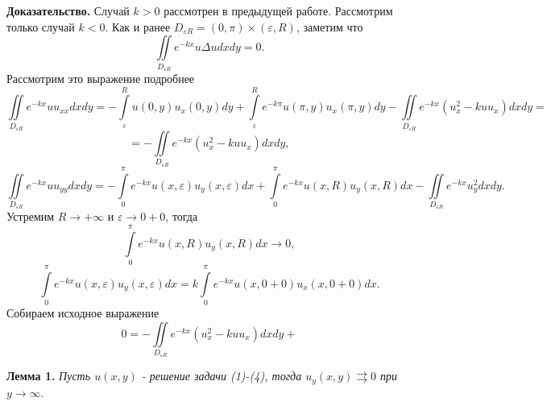 \documentclass[12pt, a4paper]{article}
\begin{document}
	\textbf{Доказательство.}
	Случай $k>0$ рассмотрен в предыдущей работе. Рассмотрим только случай $k < 0$.
	Как и ранее $D_{\varepsilon R} = (0, \pi) \times (\varepsilon, R)$, заметим что
	\begin{equation*}
		\iint\limits_{D_{\varepsilon R}} e^{-k x} u \Delta u dx dy = 0.
	\end{equation*}
	Рассмотрим это выражение подробнее
	\begin{equation*}
		\iint\limits_{D_{\varepsilon R}} e^{-kx} u u_{xx} dx dy = -\int\limits_{\varepsilon}^{R} u(0, y) u_x(0, y) dy + \int\limits_{\varepsilon}^{R} e^{-k\pi} u(\pi, y) u_x(\pi, y) dy - \iint\limits_{D_{\varepsilon R}} e^{-kx} \left(u_x^2 -k u u_x\right) dx dy  = 
	\end{equation*}
	\begin{equation*}
		= - \iint\limits_{D_{\varepsilon R}} e^{-kx} \left(u_x^2 -k u u_x\right) dx dy,
	\end{equation*}
	\begin{equation*}
		\iint\limits_{D_{\varepsilon R}} e^{-kx} u u_{yy} dx dy = -\int\limits_{0}^{\pi} e^{-kx} u(x,\varepsilon) u_y(x, \varepsilon) dx + \int\limits_{0}^{\pi} e^{-kx} u(x, R) u_y(x, R) dx - \iint\limits_{D_{\varepsilon R}} e^{-kx} u_y^2 dx dy.
	\end{equation*}
	Устремим $R \to + \infty$ и $\varepsilon \to 0+0$, тогда
		\begin{equation*}
	\int\limits_{0}^{\pi} e^{-kx} u(x, R) u_y(x, R) dx  \to 0,
	\end{equation*}
	\begin{equation*}
		\int\limits_{0}^{\pi} e^{-kx} u(x,\varepsilon) u_y(x, \varepsilon) dx = k \int\limits_0^\pi e^{-kx} u(x,0+0) u_x(x, 0+0) dx.
	\end{equation*}
	Собираем исходное выражение
	\begin{equation*}
		0 = - \iint\limits_{D_{\varepsilon R}} e^{-kx} \left(u_x^2 -k u u_x\right) dx dy + 
	\end{equation*}
	
		\textbf{Лемма 1.} \textit{Пусть $u(x,y)$ - решение задачи (1)-(4), тогда $u_y(x,y) \rightrightarrows 0$ при $ y \to \infty$}.
		
\end{document}
